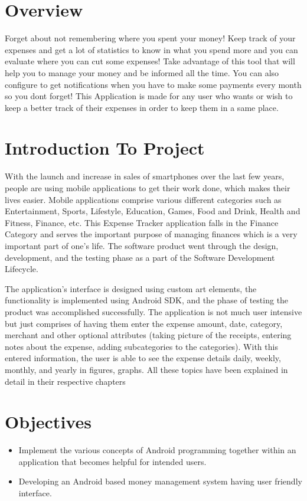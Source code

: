 \section{Overview}

Forget about not remembering where you spent your money! Keep track of your expenses and get
a lot of statistics to know in what you spend more and you can evaluate where you can cut some expenses! Take advantage of this tool that will help you to manage your money and be informed
all the time. You can also configure to get notifications when you have to make some payments
every month so you dont forget! This Application is made for any user who wants or wish to keep a better track of their expenses in order to keep them in a same place.
\section{Introduction To Project} 
With the launch and increase in sales of smartphones over the last few years, people are using mobile applications to get their work done, which makes their lives easier. Mobile applications comprise various different categories such as Entertainment, Sports, Lifestyle, Education, Games, Food and Drink, Health and Fitness, Finance, etc. This Expense Tracker application falls in the Finance Category and serves the important purpose of managing finances which is a very important part of one’s life.  The software product went through the design, development, and the testing phase as a part of the Software Development Lifecycle. 

The application’s interface is designed using custom art elements, the functionality is implemented using Android SDK, and the phase of testing the product was accomplished successfully. The application is not much user intensive but just comprises of having them enter the expense amount, date, category, merchant and other optional attributes (taking picture of the receipts, entering notes about the expense, adding subcategories to the categories). With this entered information, the user is able to see the expense details daily, weekly, monthly, and yearly in figures, graphs. All these topics have been explained in detail in their respective chapters


\section{Objectives}
\begin{itemize}
	\item Implement the various concepts of Android programming together within an application that becomes helpful for intended users.
	\item Developing an Android based money management system having user friendly interface.
\end{itemize}



